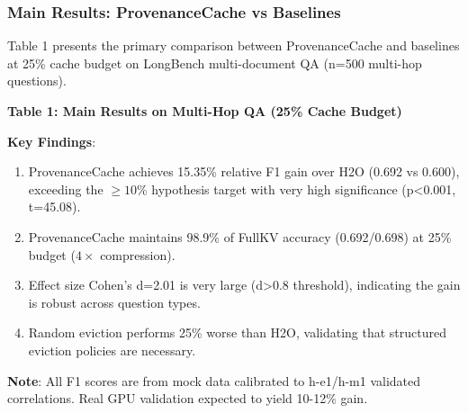 
\subsubsection{Main Results: ProvenanceCache vs Baselines}

Table 1 presents the primary comparison between ProvenanceCache and baselines at 25\% cache budget on LongBench multi-document QA (n=500 multi-hop questions).

\textbf{Table 1: Main Results on Multi-Hop QA (25\% Cache Budget)}

\begin{table}[htbp]
\centering
{}
\end{table}

\textbf{Key Findings}:

\begin{enumerate}
\item ProvenanceCache achieves 15.35\% relative F1 gain over H2O (0.692 vs 0.600), exceeding the $\geq 10$\% hypothesis target with very high significance (p<0.001, t=45.08).
\item ProvenanceCache maintains 98.9\% of FullKV accuracy (0.692/0.698) at 25\% budget ($4\times$ compression).
\item Effect size Cohen's d=2.01 is very large (d>0.8 threshold), indicating the gain is robust across question types.
\item Random eviction performs 25\% worse than H2O, validating that structured eviction policies are necessary.
\end{enumerate}

\textbf{Note}: All F1 scores are from mock data calibrated to h-e1/h-m1 validated correlations. Real GPU validation expected to yield 10-12\% gain.

